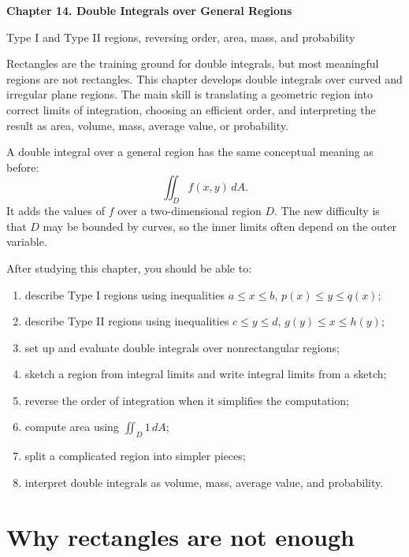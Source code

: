\documentclass[11pt]{article}
\begin{document}
\begin{center}
  {\LARGE\bfseries Chapter 14. Double Integrals over General Regions\par}
  \vspace{0.3em}
  {\large Type I and Type II regions, reversing order, area, mass, and probability\par}
\end{center}

\begin{chapteroverviewbox}
Rectangles are the training ground for double integrals, but most meaningful regions are not rectangles. This chapter develops double integrals over curved and irregular plane regions. The main skill is translating a geometric region into correct limits of integration, choosing an efficient order, and interpreting the result as area, volume, mass, average value, or probability.

A double integral over a general region has the same conceptual meaning as before:
\[
\iint_D f(x,y)\,dA.
\]
It adds the values of $f$ over a two-dimensional region $D$. The new difficulty is that $D$ may be bounded by curves, so the inner limits often depend on the outer variable.
\end{chapteroverviewbox}

\begin{goalbox}
After studying this chapter, you should be able to:
\begin{enumerate}
  \item describe Type I regions using inequalities $a\le x\le b$, $p(x)\le y\le q(x)$;
  \item describe Type II regions using inequalities $c\le y\le d$, $g(y)\le x\le h(y)$;
  \item set up and evaluate double integrals over nonrectangular regions;
  \item sketch a region from integral limits and write integral limits from a sketch;
  \item reverse the order of integration when it simplifies the computation;
  \item compute area using $\iint_D 1\,dA$;
  \item split a complicated region into simpler pieces;
  \item interpret double integrals as volume, mass, average value, and probability.
\end{enumerate}
\end{goalbox}

\section{Why rectangles are not enough}
\end{document}

